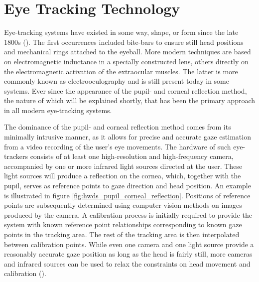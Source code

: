 \section{Eye Tracking Technology} \label{sec:hwds_EyeTrackingTechnology}

Eye-tracking systems have existed in some way, shape, or form since the late 1800s (\cite{holmqvist2011}). The first occurrences included bite-bars to ensure still head positions and mechanical rings attached to the eyeball. More modern techniques are based on electromagnetic inductance in a specially constructed lens, others directly on the electromagnetic activation of the extraocular muscles. The latter is more commonly known as electrooculography and is still present today in some systems. Ever since the appearance of the pupil- and corneal reflection method, the nature of which will be explained shortly, that has been the primary approach in all modern eye-tracking systems. 

The dominance of the pupil- and corneal reflection method comes from its minimally intrusive manner, as it allows for precise and accurate gaze estimation from a video recording of the user's eye movements. The hardware of such eye-trackers consists of at least one high-resolution and high-frequency camera, accompanied by one or more infrared light sources directed at the user. These light sources will produce a reflection on the cornea, which, together with the pupil, serves as reference points to gaze direction and head position. An example is illustrated in figure \ref{fig:hwds_pupil_corneal_reflection}. Positions of reference points are subsequently determined using computer vision methods on images produced by the camera. A calibration process is initially required to provide the system with known reference point relationships corresponding to known gaze points in the tracking area. The rest of the tracking area is then interpolated between calibration points. While even one camera and one light source provide a reasonably accurate gaze position as long as the head is fairly still, more cameras and infrared sources can be used to relax the constraints on head movement and calibration (\cite{holmqvist2011}). 


